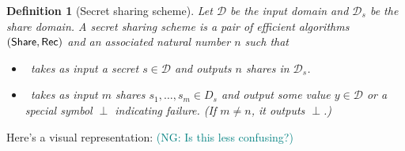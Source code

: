 \documentclass[12 pt]{article}
\newtheorem{definition}{Definition}
\def\D{\ensuremath{\mathcal{D}}}
\def\bin{\ensuremath{\{0, 1\}}}
\newcommand{\nsm}[1]{\textcolor{teal}{(NG: #1)}}
\begin{document}
\begin{definition}[Secret sharing scheme]\label{def:ss}
    Let $\D$ be the input domain and $\D_s$ be the share domain.
    A secret sharing scheme is a pair of efficient algorithms $(\mathsf{Share}, \mathsf{Rec})$
    and an associated natural number $n$ such that

    \begin{itemize}
        \item \share~takes as input a secret $s \in \D$ and outputs $n$ 
        shares in $\D_s$.
        \item \rec~takes as input $m$ shares $s_1, \ldots, s_m \in D_s$ 
        and output some value $y \in \D$ or a special symbol $\perp$ 
        indicating failure. (If $m \neq n$, it outputs $\perp$.)
    \end{itemize}
\end{definition}


Here's a visual representation: \nsm{Is this less confusing?}
\end{document}

